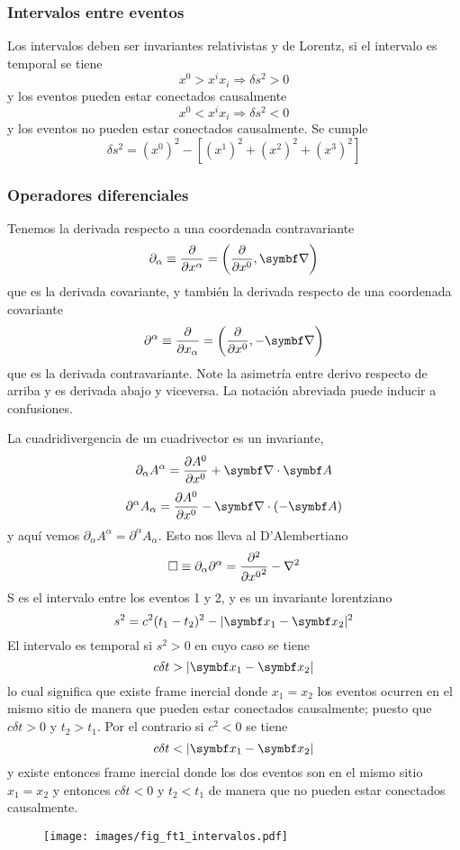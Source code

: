 \documentclass[10pt,oneside]{CBFT_book}
\begin{document}
\subsubsection{Intervalos entre eventos}

Los intervalos deben ser invariantes relativistas y de Lorentz, si el intervalo es temporal se tiene 
\[
	x^0 > x^i x_i \Rightarrow \delta s^2 > 0  
\]
y los eventos pueden estar conectados causalmente
\[
	x^0 < x^i x_i \Rightarrow \delta s^2 < 0 
\]
y los eventos no pueden estar conectados causalmente. Se cumple
\[
	\delta s^2 = (x^0)^2 - [ (x^1)^2 + (x^2)^2 + (x^3)^2 ]
\]

\subsubsection{Operadores diferenciales}

Tenemos la derivada respecto a una coordenada contravariante
\[
	\partial_\alpha \equiv \dpar{}{x^\alpha} = \left( \dpar{}{x^0}, \Nabla \right)
\]
que es la derivada covariante, y también la derivada respecto de una coordenada covariante
\[
	\partial^\alpha \equiv \dpar{}{x_\alpha} = \left( \dpar{}{x^0}, - \Nabla \right)
\]
que es la derivada contravariante. Note la asimetría entre derivo respecto de arriba y es derivada abajo
y viceversa. La notación abreviada puede inducir a confusiones.

La cuadridivergencia de un cuadrivector es un invariante,
\[
	\partial_\alpha A^\alpha = \dpar{A^0}{x^0} + \Nabla\cdot\vb{A}
\]
\[
	\partial^\alpha A_\alpha = \dpar{A^0}{x^0} - \Nabla\cdot(-\vb{A})
\]
y aquí vemos $\partial_\alpha A^\alpha = \partial^\alpha A_\alpha$. Esto nos lleva al D'Alembertiano
\[
	\Box \equiv \partial_\alpha \partial^\alpha = \dpar[2]{}{x^0} - \nabla^2
\]
S es el intervalo entre los eventos 1 y 2, y es un invariante lorentziano
\[
	s^2 = c^2( t_1 - t_2 )^2 - | \vb{x}_1 - \vb{x}_2 |^2
\]
El intervalo es temporal si $s^2 >0$ en cuyo caso se tiene 
\[
	c \delta t >  | \vb{x}_1 - \vb{x}_2 |
\]
lo cual significa que existe frame inercial donde $x_1=x_2$ los eventos ocurren en el mismo sitio de manera
que pueden estar conectados causalmente; puesto que $c\delta t > 0$ y $t_2>t_1$. Por el contrario si 
$c^2 < 0$ se tiene 
\[
	c \delta t <  | \vb{x}_1 - \vb{x}_2 |
\]
y existe entonces frame inercial donde los dos eventos son en el mismo sitio $x_1=x_2$ y entonces $c\delta t 
< 0$ y $t_2 < t_1$ de manera que no pueden estar conectados causalmente.

\begin{figure}[htb]
	\begin{center}
	\texttt{[image: images/fig\_ft1\_intervalos.pdf]}	 
	\end{center}
	\caption{}
\end{figure} 
\end{document}

